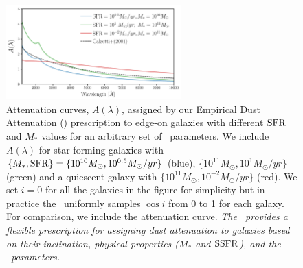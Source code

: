 \begin{figure}
\begin{center}
    \includegraphics[width=0.6\textwidth]{figs/dems.pdf}
    \caption{\label{fig:dem_av}
    Attenuation curves, $A(\lambda)$, assigned by our Empirical Dust
    Attenuation (\eda) prescription to edge-on galaxies with different ${\rm SFR}$ and
    $M_*$ values for an arbitrary set of \eda~parameters. We include
    $A(\lambda)$ for star-forming galaxies with $\{M_*, {\rm SFR}\} =
    \{10^{10}M_\odot, 10^{0.5}M_\odot/yr\}$ (blue), $\{10^{11}M_\odot, 10^{1}
    M_\odot/yr\}$ (green) and a quiescent galaxy with $\{10^{11}M_\odot,
    10^{-2}M_\odot/yr\}$ (red). We set $i=0$ for
    all the galaxies in the figure for simplicity but in practice the
    \eda~uniformly samples $\cos i$ from 0 to 1 for each galaxy.
    For comparison, we include the \cite{calzetti2001} attenuation curve.
    {\em The \eda~provides a flexible prescription for assigning dust
    attenuation to galaxies based on their inclination, physical properties
    ($M_*$ and ${\rm SSFR}$), and the \eda~parameters.}
    } 
\end{center}
\end{figure}


